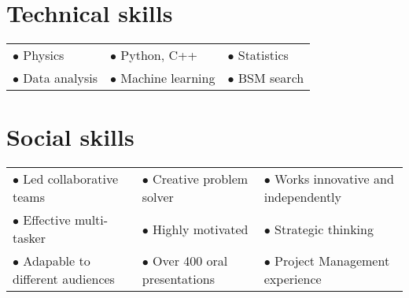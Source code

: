 \section{Technical skills}
\vspace{-1em}
\begin{tabularx}{\textwidth}{p{} p{}  p{}}
    $\bullet$ Physics & $\bullet$ Python, C++ & $\bullet$ Statistics \\
    $\bullet$ Data analysis & $\bullet$ Machine learning &  $\bullet$ BSM search \\      
\end{tabularx}

\section{Social skills}
\vspace{-1em}
\begin{tabularx}{\textwidth}{p{} p{}  p{}}
    $\bullet$ Led collaborative teams & $\bullet$ Creative problem solver & $\bullet$ Works innovative  and independently\\
    $\bullet$ Effective multi-tasker & $\bullet$ Highly motivated & $\bullet$ Strategic thinking \\
    $\bullet$ Adapable to different audiences & $\bullet$ Over 400 oral presentations & $\bullet$ Project Management experience \\
 
\end{tabularx}


